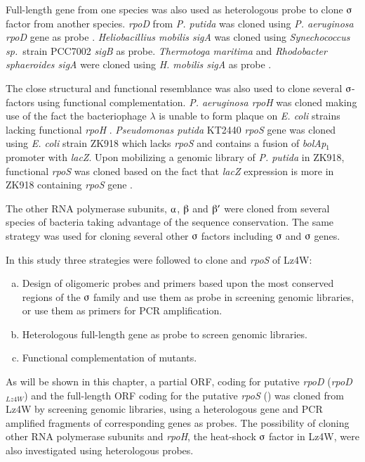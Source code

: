 Full-length gene from one species was also used as heterologous
probe to clone $\sigmaup$ factor from another species\@.
\textit{rpoD} from \textit{P. putida} was cloned using \textit{P.
aeruginosa rpoD} gene as probe \citep{Fujita1995}.
\textit{Heliobacillius mobilis sigA} was cloned using
\textit{Synechococcus sp.}\ strain PCC7002 \textit{sigB} as probe.
\textit{Thermotoga maritima} and \textit{Rhodobacter sphaeroides
sigA} were cloned using \textit{H. mobilis sigA} as probe
\citep{Gruber1997}.

The close structural and functional resemblance was also used to
clone several $\sigmaup$-factors using functional complementation.
\textit{P. aeruginosa rpoH} was cloned making use of the fact the
bacteriophage $\lambda$ is unable to form plaque on \textit{E.
coli} strains lacking functional \textit{rpoH}
\citep{Benvenisti1995}. \textit{Pseudomonas putida} KT2440
\textit{rpoS} gene was cloned using \textit{E. coli} strain ZK918
which lacks \textit{rpoS} and contains a fusion of
\textit{bolAp$_{1}$} promoter with \textit{lacZ}. Upon mobilizing
a genomic library of \textit{P. putida} in ZK918, functional
\textit{rpoS} was cloned based on the fact that \textit{lacZ}
expression is more in ZK918 containing \textit{rpoS} gene
\citep{Ramos1998}.

The other RNA polymerase subunits, $\alphaup$, $\betaup$ and
$\betaup'$ were cloned from several species of bacteria taking
advantage of the sequence conservation. The same strategy was used
for cloning several other $\sigmaup$ factors including
$\sigmaup$ and $\sigmaup$ genes.

In this study three strategies were followed to clone  and
\emph{rpoS} of  Lz4W:

\begin{enumerate}[a)]

\item Design of oligomeric probes and primers based upon the most
conserved regions of the $\sigmaup$ family and use them as probe
in screening genomic libraries, or use them as primers for PCR
amplification.

\item Heterologous full-length gene as probe to screen genomic
libraries.

\item Functional complementation of  mutants.
\end{enumerate}

As will be shown in this chapter, a partial ORF, coding for
putative \emph{rpoD} (\emph{rpoD}$_{Lz4W}$) and the full-length
ORF coding for the putative \emph{rpoS} (\lzsig{}) was cloned from
Lz4W by screening genomic libraries, using a heterologous gene and
PCR amplified fragments of corresponding genes as probes. The
possibility of cloning other RNA polymerase subunits and
\emph{rpoH}, the heat-shock $\sigmaup$ factor in Lz4W, were also
investigated using heterologous probes.

